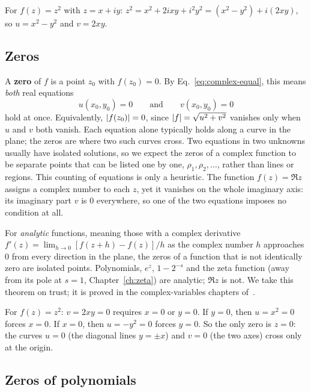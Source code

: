 For $f(z)=z^2$ with $z=x+iy$: $z^2=x^2+2ixy+i^2y^2=(x^2-y^2)+i(2xy)$, so $u=x^2-y^2$ and $v=2xy$.

\subsection{Zeros}

A \textbf{zero} of $f$ is a point $z_0$ with $f(z_0)=0$. By Eq.~\eqref{eq:complex-equal}, this means \emph{both} real equations
\begin{equation}
u(x_0,y_0)=0\qquad\text{and}\qquad v(x_0,y_0)=0\label{eq:complex-zero}
\end{equation}
hold at once. Equivalently, $\left\lvert f(z_0)\right\rvert=0$, since $\left\lvert f\right\rvert=\sqrt{u^2+v^2}$ vanishes only when $u$ and $v$ both vanish. Each equation alone typically holds along a curve in the plane; the zeros are where two such curves cross. Two equations in two unknowns usually have isolated solutions, so we expect the zeros of a complex function to be separate points that can be listed one by one, $\rho_1,\rho_2,\dots$, rather than lines or regions. This counting of equations is only a heuristic. The function $f(z)=\Re z$ assigns a complex number to each $z$, yet it vanishes on the whole imaginary axis: its imaginary part $v$ is $0$ everywhere, so one of the two equations imposes no condition at all.
\begin{beyond}
For \emph{analytic} functions, meaning those with a complex derivative $f'(z)=\lim_{h\to0}[f(z+h)-f(z)]/h$ as the complex number $h$ approaches $0$ from every direction in the plane, the zeros of a function that is not identically zero are isolated points. Polynomials, $e^z$, $1-2^{-s}$ and the zeta function (away from its pole at $s=1$, Chapter~\ref{ch:zeta}) are analytic; $\Re z$ is not. We take this theorem on trust; it is proved in the complex-variables chapters of~\cite{rhb}.
\end{beyond}

For $f(z)=z^2$: $v=2xy=0$ requires $x=0$ or $y=0$. If $y=0$, then $u=x^2=0$ forces $x=0$. If $x=0$, then $u=-y^2=0$ forces $y=0$. So the only zero is $z=0$: the curves $u=0$ (the diagonal lines $y=\pm x$) and $v=0$ (the two axes) cross only at the origin.

\subsection{Zeros of polynomials}

